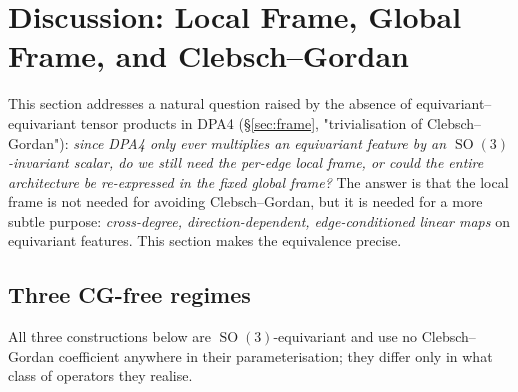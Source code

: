 \documentclass[11pt,a4paper]{article}
\DeclareMathOperator{\SO}{SO}
\theoremstyle{plain}
\theoremstyle{definition}
\theoremstyle{remark}
\begin{document}
\section{Discussion: Local Frame, Global Frame, and Clebsch--Gordan}\label{sec:discuss-frames}

This section addresses a natural question raised by the absence of
equivariant--equivariant tensor products in DPA4 (\S\ref{sec:frame},
"trivialisation of Clebsch--Gordan"): \emph{since DPA4 only ever multiplies an
    equivariant feature by an $\SO(3)$-invariant scalar, do we still need the
    per-edge local frame, or could the entire architecture be re-expressed in the
    fixed global frame?} The answer is that the local frame is not needed for
avoiding Clebsch--Gordan, but it is needed for a more subtle purpose:
\emph{cross-degree, direction-dependent, edge-conditioned linear maps} on
equivariant features. This section makes the equivalence precise.

\subsection{Three CG-free regimes}\label{sec:three-regimes}

All three constructions below are $\SO(3)$-equivariant and use no
Clebsch--Gordan coefficient anywhere in their parameterisation; they differ
only in what class of operators they realise.
\end{document}
